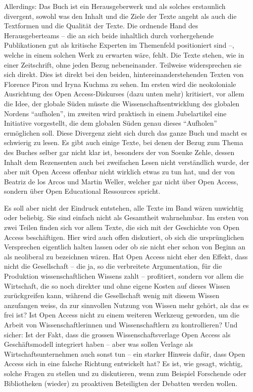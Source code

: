 \documentclass[a4paper,
fontsize=11pt,
oneside,
numbers=noperiodatend,
parskip=half-,
bibliography=totoc,
final
]{scrartcl}
\begin{document}
Allerdings: Das Buch ist ein Herausgeberwerk und als solches erstaunlich
divergent, sowohl was den Inhalt und die Ziele der Texte angeht als auch
die Textformen und die Qualität der Texte. Die ordnende Hand des
Herausgeberteams -- die an sich beide inhaltlich durch vorhergehende
Publikationen gut als kritische Experten im Themenfeld positioniert sind
--, welche in einem solchen Werk zu erwarten wäre, fehlt. Die Texte
stehen, wie in einer Zeitschrift, ohne jeden Bezug nebeneinander.
Teilweise widersprechen sie sich direkt. Dies ist direkt bei den beiden,
hintereinanderstehenden Texten von Florence Piron und Iryna Kuchma zu
sehen. Im ersten wird die neokoloniale Ausrichtung des Open
Access-Diskurses (dazu unten mehr) kritisiert, vor allem die Idee, der
globale Süden müsste die Wissenschaftsentwicklung des globalen Nordens
\enquote{aufholen}, im zweiten wird praktisch in einem Jubelartikel eine
Initiative vorgestellt, die dem globalen Süden genau dieses
\enquote{Aufholen} ermöglichen soll. Diese Divergenz zieht sich durch
das ganze Buch und macht es schwierig zu lesen. Es gibt auch einige
Texte, bei denen der Bezug zum Thema des Buches selber gar nicht klar
ist, besonders der von Soenke Zehle, dessen Inhalt dem Rezensenten auch
bei zweifachen Lesen nicht verständlich wurde, der aber mit Open Access
offenbar nicht wirklich etwas zu tun hat, und der von Beatriz de los
Arcos und Martin Weller, welcher gar nicht über Open Access, sondern
über Open Educational Ressources spricht.

Es soll aber nicht der Eindruck entstehen, alle Texte im Band wären
unwichtig oder beliebig. Sie sind einfach nicht als Gesamtheit
wahrnehmbar. Im ersten von zwei Teilen finden sich vor allem Texte, die
sich mit der Geschichte von Open Access beschäftigen. Hier wird auch
offen diskutiert, ob sich die ursprünglichen Versprechen eigentlich
halten lassen oder ob sie nicht eher schon von Beginn an als neoliberal
zu bezeichnen wären. Hat Open Access nicht eher den Effekt, dass nicht
die Gesellschaft -- die ja, so die verbreitete Argumentation, für die
Produktion wissenschaftlichen Wissens zahlt -- profitiert, sondern vor
allem die Wirtschaft, die so noch direkter und ohne eigene Kosten auf
dieses Wissen zurückgreifen kann, während die Gesellschaft wenig mit
diesem Wissen anzufangen weiss, da zur sinnvollen Nutzung von Wissen
mehr gehört, als das es frei ist? Ist Open Access nicht zu einem
weiteren Werkzeug geworden, um die Arbeit von Wissenschaftlerinnen und
Wissenschaftlern zu kontrollieren? Und sicher: Ist der Fakt, dass die
grossen Wissenschaftsverlage Open Access als Geschäftsmodell integriert
haben -- aber was sollen Verlage als Wirtschaftsunternehmen auch sonst
tun -- ein starker Hinweis dafür, dass Open Access sich in eine falsche
Richtung entwickelt hat? Es ist, wie gesagt, wichtig, solche Fragen zu
stellen und zu diskutieren, wenn zum Beispiel Forschende oder
Bibliotheken (wieder) zu proaktiven Beteiligten der Debatten werden
wollen.
\end{document}
